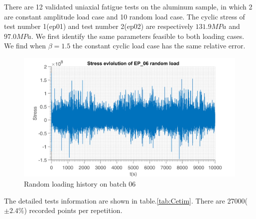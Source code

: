 \documentclass[3p,times,number,review]{elsarticle}
\begin{document}
There are 12 validated uniaxial fatigue tests on the aluminum sample, in which 2 are constant amplitude load case and 10 random  load case. 
The cyclic stress of test number 1(ep01) and test number 2(ep02) are respectively $131.9MPa$ and $97.0MPa$. We first identify the same parameters feasible to both loading cases. We find when $\beta=1.5$ the constant cyclic load case has the same relative error.

	\begin{figure}[!h]
	\centering
	\includegraphics[width=\textwidth]{figures//ep_06_stress.png} 
	\caption{Random loading history on batch 06}
\end{figure}	
The detailed tests information are shown in table.\ref{tab:Cetim}. There are 27000($\pm 2.4\%$) recorded points per repetition. 
\end{document}
